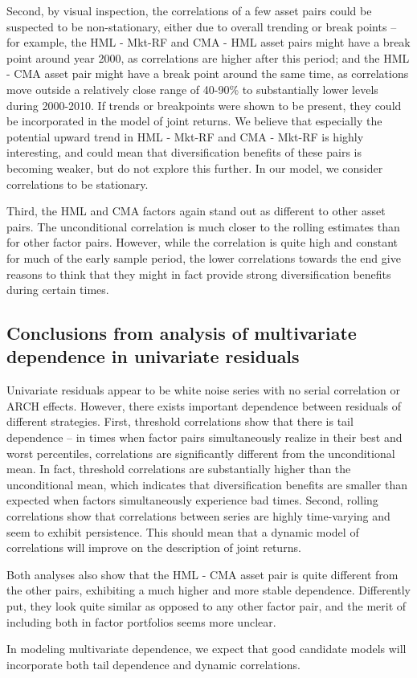 Second, by visual inspection, the correlations of a few asset pairs could be suspected to be non-stationary, either due to overall trending or break points -- for example, the HML - Mkt-RF and CMA - HML asset pairs might have a break point around year 2000, as correlations are higher after this period; and the HML - CMA asset pair might have a break point around the same time, as correlations move outside a relatively close range of 40-90\% to substantially lower levels during 2000-2010. If trends or breakpoints were shown to be present, they could be incorporated in the model of joint returns. We believe that especially the potential upward trend in HML - Mkt-RF and CMA - Mkt-RF is highly interesting, and could mean that diversification benefits of these pairs is becoming weaker, but do not explore this further. In our model, we consider correlations to be stationary.

Third, the HML and CMA factors again stand out as different to other asset pairs. The unconditional correlation is much closer to the rolling estimates than for other factor pairs. However, while the correlation is quite high and constant for much of the early sample period, the lower correlations towards the end give reasons to think that they might in fact provide strong diversification benefits during certain times.

\subsection{Conclusions from analysis of multivariate dependence in univariate residuals}
Univariate residuals appear to be white noise series with no serial correlation or ARCH effects. However, there exists important dependence between residuals of different strategies. First, threshold correlations show that there is tail dependence -- in times when factor pairs simultaneously realize in their best and worst percentiles, correlations are significantly different from the unconditional mean. In fact, threshold correlations are substantially higher than the unconditional mean, which indicates that diversification benefits are smaller than expected when factors simultaneously experience bad times. Second, rolling correlations show that correlations between series are highly time-varying and seem to exhibit persistence. This should mean that a dynamic model of correlations will improve on the description of joint returns.

Both analyses also show that the HML - CMA asset pair is quite different from the other pairs, exhibiting a much higher and more stable dependence. Differently put, they look quite similar as opposed to any other factor pair, and the merit of including both in factor portfolios seems more unclear.

In modeling multivariate dependence, we expect that good candidate models will incorporate both tail dependence and dynamic correlations.
